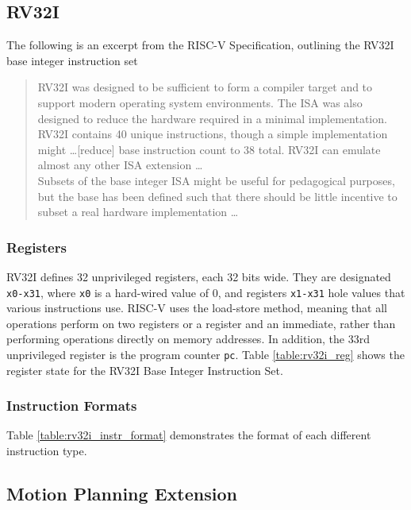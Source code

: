 \subsection{RV32I}

        The following is an excerpt from the RISC-V Specification, outlining the RV32I base integer instruction set \cite{Waterman2019}
        \begin{quote}{}
            \small{RV32I was designed to be sufficient to form a compiler target and to support modern operating system environments. The ISA was also designed to reduce the hardware required in a minimal implementation. RV32I contains 40 unique instructions, though a simple implementation might \dots [reduce] base instruction count to 38 total. RV32I can emulate almost any other ISA extension \dots \\
            Subsets of the base integer ISA might be useful for pedagogical purposes, but the base has been defined such that there should be little incentive to subset a real hardware implementation \dots}
        \end{quote}

        \subsubsection*{Registers}
        RV32I defines 32 unprivileged registers, each 32 bits wide. They are designated \texttt{x0-x31}, where \texttt{x0} is a hard-wired value of $0$, and registers \texttt{x1-x31} hole values that various instructions use. RISC-V uses the load-store method, meaning that all operations perform on two registers or a register and an immediate, rather than performing operations directly on memory addresses. In addition, the 33rd unprivileged register is the program counter \texttt{pc}. Table \ref{table:rv32i_reg} shows the register state for the RV32I Base Integer Instruction Set.
        

        \subsubsection{Instruction Formats}
        Table \ref{table:rv32i_instr_format} demonstrates the format of each different instruction type. 
        



    \subsection{Motion Planning Extension}
